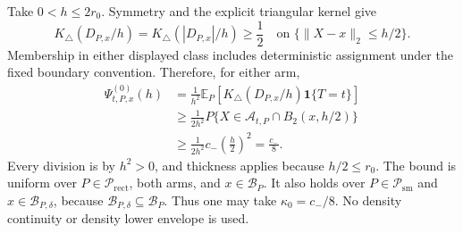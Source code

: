 Take \(0<h\leq 2r_0\).  Symmetry and the explicit triangular kernel give
\[
 K_\triangle(D_{P,x}/h)=K_\triangle(|D_{P,x}|/h)\geq\frac12
 \quad\text{on }\{\lVert X-x\rVert_2\leq h/2\}.
\]
Membership in either displayed class includes deterministic assignment under the fixed boundary convention.  Therefore, for either arm,
\[
\begin{aligned}
 \Psi^{(0)}_{t,P,x}(h)
 &=\frac1{h^2}\mathbb E_P\!\left[K_\triangle(D_{P,x}/h)\mathbf1\{T=t\}\right]\\
 &\geq\frac1{2h^2}P\{X\in\mathcal A_{t,P}\cap B_2(x,h/2)\}\\
 &\geq\frac1{2h^2}c_-\left(\frac h2\right)^2
 =\frac{c_-}{8}.
\end{aligned}
\]
Every division is by \(h^2>0\), and thickness applies because \(h/2\leq r_0\).  The bound is uniform over \(P\in\mathcal P_{\mathrm{rect}}\), both arms, and \(x\in\mathcal B_P\).  It also holds over \(P\in\mathcal P_{\mathrm{sm}}\) and \(x\in\mathcal B_{P,\delta}\), because \(\mathcal B_{P,\delta}\subseteq\mathcal B_P\).  Thus one may take \(\kappa_0=c_-/8\).  No density continuity or density lower envelope is used.